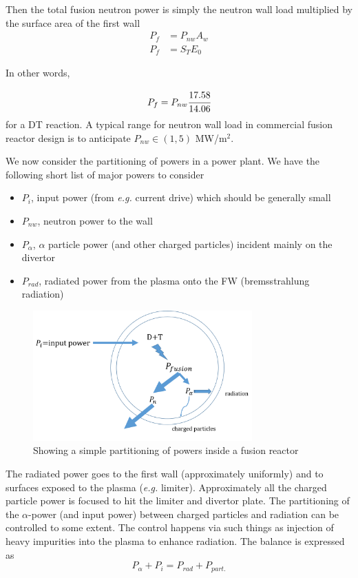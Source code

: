 \documentclass[11pt]{report} %
\begin{document}
Then the total fusion neutron power is simply the neutron wall load multiplied by the surface area of the first wall
\begin{align}
P_f &= P_{nw}A_w\\
P_f & = S_T E_0
\end{align}

In other words, 

\begin{equation}
P_f = P_{nw}\cfrac{17.58}{14.06}
\end{equation}
for a DT reaction. A typical range for neutron wall load in commercial fusion reactor design is to anticipate $P_{nw} \in (1,5)$ MW/m$^2$.

We now consider the partitioning of powers in a power plant. We have the following short list of major powers to consider
\begin{itemize}
\item $P_i$, input power (from {\it e.g.} current drive) which should be generally small
\item $P_{nw}$, neutron power to the wall
\item $P_\alpha$, $\alpha$ particle power (and other charged particles) incident mainly on the divertor
\item $P_{rad}$, radiated power from the plasma onto the FW (bremsstrahlung radiation)
\end{itemize}
\begin{figure}
\centering
\includegraphics[width=0.75\textwidth]{../images/power_partition.png} 
\caption{Showing a simple partitioning of powers inside a fusion reactor}
\label{fig:power_partition}
\end{figure}

The radiated power goes to the first wall (approximately uniformly) and to surfaces exposed to the plasma ({\it e.g.} limiter). Approximately all the charged particle power is focused to hit the limiter and divertor plate. The partitioning of the $\alpha$-power (and input power) between charged particles and radiation can be controlled to some extent. The control happens via such things as injection of heavy impurities into the plasma to enhance radiation. The balance is expressed as
\begin{equation}
P_\alpha + P_i = P_{rad} + P_{part.}
\end{equation}
\end{document}
